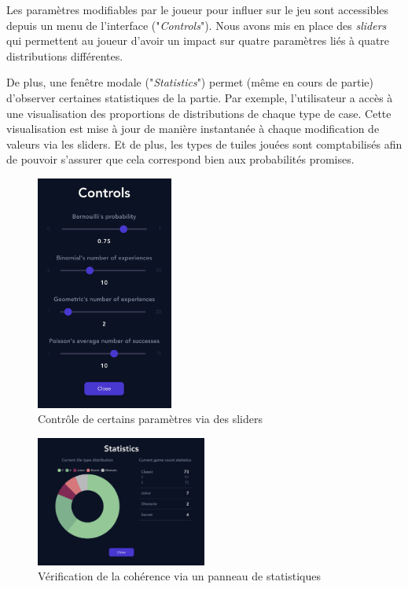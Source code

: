 \documentclass[a4paper, 12pt]{report}
\begin{document}
\vspace{0.5cm}

\tabto{1cm}Les paramètres modifiables par le joueur pour influer sur le jeu sont accessibles depuis un menu de l'interface ("\textit{Controls}").
Nous avons mis en place des \textit{sliders} qui permettent au joueur d'avoir un impact sur quatre paramètres liés à quatre distributions différentes.

\tabto{1cm}De plus, une fenêtre modale ("\textit{Statistics}") permet (même en cours de partie) d'observer certaines statistiques de la partie. Par exemple, 
l'utilisateur a accès à une visualisation des proportions de distributions de chaque type de case. Cette visualisation est mise 
à jour de manière instantanée à chaque modification de valeurs via les sliders. Et de plus, les types de tuiles jouées sont comptabilisés afin 
de pouvoir s'assurer que cela correspond bien aux probabilités promises.

\begin{figure}[!t]
\centering
\includegraphics[width=0.4\textwidth]{../images/2048-revisited-version-controls.jpg}
\caption{Contrôle de certains paramètres via des sliders}
\label{Controls}
\end{figure}

\begin{figure}[!t]
\centering
\includegraphics[width=0.5\textwidth]{../images/2048-revisited-version-statistics.jpg}
\caption{Vérification de la cohérence via un panneau de statistiques}
\label{Statistics}
\end{figure}
\end{document}
